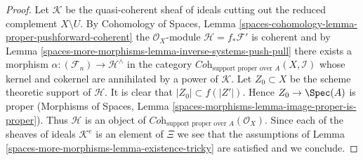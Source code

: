 \begin{proof}
\medskip\noindent
Let $\mathcal{K}$ be the quasi-coherent sheaf of ideals cutting
out the reduced complement $X \setminus U$.
By Cohomology of Spaces, Lemma
\ref{spaces-cohomology-lemma-proper-pushforward-coherent}
the $\mathcal{O}_X$-module $\mathcal{H} = f_*\mathcal{F}'$ is coherent
and by Lemma \ref{spaces-more-morphisms-lemma-inverse-systems-push-pull}
there exists a morphism $\alpha : (\mathcal{F}_n) \to \mathcal{H}^\wedge$
in the category $\textit{Coh}_{\text{support proper over } A}(X, \mathcal{I})$
whose kernel and cokernel are annihilated by a power of $\mathcal{K}$.
Let $Z_0 \subset X$ be the scheme theoretic support of $\mathcal{H}$.
It is clear that $|Z_0| \subset f(|Z'|)$. Hence
$Z_0 \to \Spec(A)$ is proper
(Morphisms of Spaces, Lemma
\ref{spaces-morphisms-lemma-image-proper-is-proper}).
Thus $\mathcal{H}$ is an object of
$\textit{Coh}_{\text{support proper over } A}(\mathcal{O}_X)$.
Since each of the sheaves of ideals $\mathcal{K}^e$ is an element of
$\Xi$ we see that the assumptions of Lemma \ref{spaces-more-morphisms-lemma-existence-tricky}
are satisfied and we conclude.
\end{proof}


